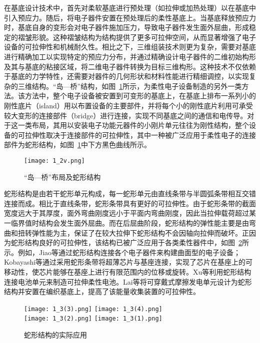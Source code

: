 在基底设计技术\cite{bowden1998spontaneous}中，首先对柔软基底进行预处理（如拉伸或加热处理）以在基底中引入预应力。随后，将电子器件安置在预处理后的柔性基底上。当基底释放预应力时，基底自身的变形会对电子器件施加压力，导致电子器件发生面外屈曲，形成稳定的褶皱形貌。这种褶皱结构为结构提供了更多可拉伸空间，从而显著增强了电子设备的可拉伸性和机械耐久性。相比之下，三维组装技术则更为复杂，需要对基底进行精确加工以实现特定的预应力分布，并通过精确设计电子器件的二维初始构形及其与基底的粘接区域，将二维电子器件转换为目标三维构形\cite{cheng2023programming}。这种技术不仅依赖于基底的力学特性，还需要对器件的几何形状和材料性能进行精细调控，以实现复杂的三维结构。“岛—桥”结构\cite{zhang2013buckling}，如图~\ref{fig:1_2v}所示，为柔性电子设备制造的另外一类方法。该方法中，整个电子设备被安置到可变形的基底上，在基底上排布一系列小的刚性底片（island）用以布置设备的主要部件，并将每个小的刚性底片利用可承受较大变形的连接部件（bridge）进行连接，实现不同基底之间的通信和电传导。对于这一类布局，其用以安装电子功能元器件的小刚片单元往往为刚性结构，整个设备的可拉伸性取决于连接部件的可拉伸性，其中一种被广泛应用于柔性电子的连接部件为蛇形结构\cite{li2005compliant}，如图~\ref{fig:1_2v}中下方黑色曲线所示。
\begin{figure}
	\centering
	\texttt{[image: 1\_2v.png]}
	\caption{“岛—桥”布局及蛇形结构\cite{zhang2013buckling}}
	\label{fig:1_2v}
\end{figure}

蛇形结构是由若干蛇形单元构成，每一蛇形单元由直线条带与半圆弧条带相互交错连接而成\cite{li2005compliant}。相比于直线条带，蛇形条带具有更好的可拉伸性。由于蛇形条带的截面宽度远大于其厚度，面外弯曲刚度远小于平面内弯曲刚度，因此当拉伸载荷超过某一临界值时结构会发生面外屈曲。而在后屈曲阶段，蛇形结构的弹性能主要是由弯曲和扭转弹性能为主，保证了在较大拉伸下蛇形结构不会因轴向拉伸而破坏。正因为蛇形结构良好的可拉伸性，该结构已被广泛应用于各类柔性器件中，如图~\ref{fig:1_3v}所示。例如，Jiao等\cite{jiao2023vertical}通过蛇形结构连接各个电子器件来构建曲面型的电子设备；Kobayashi等\cite{Kobayashi2018FlexibleSW}通过采用蛇形条带将超薄芯片与基座连接，实现了芯片在基座上的可移动性，使芯片能够在基座上进行有限范围内的位移或旋转。Xu等\cite{xu2013stretchable}利用蛇形结构连接电池单元来制造可拉伸柔性电池。Lai等\cite{lai2017single}将可穿戴式摩擦发电单元设计为蛇形结构并安置在编织基底上，提高了该能量收集装置的可拉伸性。
\begin{figure}
	\centering
	{\texttt{[image: 1\_3(3).png]}}
	{\texttt{[image: 1\_3(4).png]}}\\
	{\texttt{[image: 1\_3(2).png]}}
	{\texttt{[image: 1\_3(1).png]}}
	\caption{蛇形结构的实际应用}
	\label{fig:1_3v}
\end{figure}

